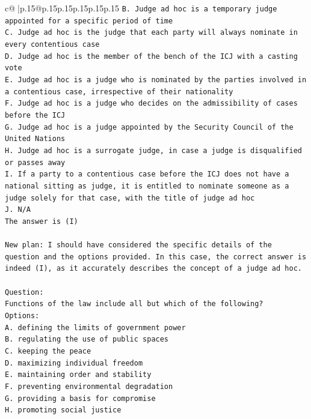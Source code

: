 \documentclass{article}
\begin{document}
{\begin{supertabular}{c@{$\;$}|p{.15\linewidth}@{}p{.15\linewidth}p{.15\linewidth}p{.15\linewidth}p{.15\linewidth}p{.15\linewidth}}
{{{\texttt{B. Judge ad hoc is a temporary judge appointed for a specific period of time} \\
\texttt{C. Judge ad hoc is the judge that each party will always nominate in every contentious case} \\
\texttt{D. Judge ad hoc is the member of the bench of the ICJ with a casting vote} \\
\texttt{E. Judge ad hoc is a judge who is nominated by the parties involved in a contentious case, irrespective of their nationality} \\
\texttt{F. Judge ad hoc is a judge who decides on the admissibility of cases before the ICJ} \\
\texttt{G. Judge ad hoc is a judge appointed by the Security Council of the United Nations} \\
\texttt{H. Judge ad hoc is a surrogate judge, in case a judge is disqualified or passes away} \\
\texttt{I. If a party to a contentious case before the ICJ does not have a national sitting as judge, it is entitled to nominate someone as a judge solely for that case, with the title of judge ad hoc} \\
\texttt{J. N/A} \\
\texttt{The answer is (I)} \\
\\ 
\texttt{New plan: I should have considered the specific details of the question and the options provided. In this case, the correct answer is indeed (I), as it accurately describes the concept of a judge ad hoc.} \\
\\ 
\texttt{Question:} \\
\texttt{Functions of the law include all but which of the following?} \\
\texttt{Options:} \\
\texttt{A. defining the limits of government power} \\
\texttt{B. regulating the use of public spaces} \\
\texttt{C. keeping the peace} \\
\texttt{D. maximizing individual freedom} \\
\texttt{E. maintaining order and stability} \\
\texttt{F. preventing environmental degradation} \\
\texttt{G. providing a basis for compromise} \\
\texttt{H. promoting social justice} \\
}}}
\end{supertabular}}
\end{document}
